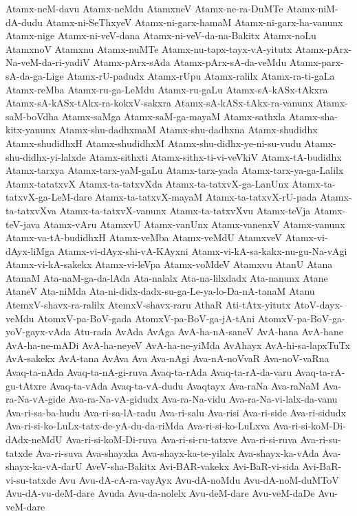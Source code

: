 {Atamx-neM-davu
Atamx-neMdu
AtamxneV
Atamx-ne-ra-DuMTe
Atamx-niM-dA-dudu
Atamx-ni-SeThxyeV
Atamx-ni-garx-hamaM
Atamx-ni-garx-ha-vanunx
Atamx-nige
Atamx-ni-veV-dana
Atamx-ni-veV-da-na-Bakitx
Atamx-noLu
AtamxnoV
Atamxnu
Atamx-nuMTe
Atamx-nu-tapx-tayx-vA-yitutx
Atamx-pArx-Na-veM-da-ri-yadiV
Atamx-pArx-sAda
Atamx-pArx-sA-da-veMdu
Atamx-parx-sA-da-ga-Lige
Atamx-rU-padudx
Atamx-rUpu
Atamx-ralilx
Atamx-ra-ti-gaLa
Atamx-reMba
Atamx-ru-ga-LeMdu
Atamx-ru-gaLu
Atamx-sA-kASx-tAkxra
Atamx-sA-kASx-tAkx-ra-kokxV-sakxra
Atamx-sA-kASx-tAkx-ra-vanunx
Atamx-saM-boVdha
Atamx-saMga
Atamx-saM-ga-mayaM
Atamx-sathxla
Atamx-sha-kitx-yanunx
Atamx-shu-dadhxmaM
Atamx-shu-dadhxna
Atamx-shudidhx
Atamx-shudidhxH
Atamx-shudidhxM
Atamx-shu-didhx-ye-ni-su-vudu
Atamx-shu-didhx-yi-lalxde
Atamx-sithxti
Atamx-sithx-ti-vi-veVkiV
Atamx-tA-budidhx
Atamx-tarxya
Atamx-tarx-yaM-gaLu
Atamx-tarx-yada
Atamx-tarx-ya-ga-Lalilx
Atamx-tatatxvX
Atamx-ta-tatxvXda
Atamx-ta-tatxvX-ga-LanUnx
Atamx-ta-tatxvX-ga-LeM-dare
Atamx-ta-tatxvX-mayaM
Atamx-ta-tatxvX-rU-pada
Atamx-ta-tatxvXva
Atamx-ta-tatxvX-vanunx
Atamx-ta-tatxvXvu
Atamx-teVja
Atamx-teV-java
Atamx-vAru
AtamxvU
Atamx-vanUnx
Atamx-vanenxV
Atamx-vanunx
Atamx-va-tA-budidhxH
Atamx-veMba
Atamx-veMdU
AtamxveV
Atamx-vi-dAyx-liMga
Atamx-vi-dAyx-shi-vA-KAyxni
Atamx-vi-kA-sa-kakx-nu-gu-Na-vAgi
Atamx-vi-kA-sakekx
Atamx-vi-leVpa
Atamx-voMdeV
Atamxvu
AtanU
Atana
AtanaM
Ata-naM-ga-da-lAda
Ata-nalalx
Ata-na-lilxdadx
Ata-nanunx
Atane
AtaneV
Ata-niMda
Ata-ni-didx-dadx-su-ga-Le-ya-lo-Da-nA-tanaM
Atanu
AtemxV-shavx-ra-ralilx
AtemxV-shavx-raru
AthaR
Ati-tAtx-yitutx
AtoV-dayx-veMdu
AtomxV-pa-BoV-gada
AtomxV-pa-BoV-ga-jA-tAni
AtomxV-pa-BoV-ga-yoV-gayx-vAda
Atu-rada
AvAda
AvAga
AvA-ha-nA-saneV
AvA-hana
AvA-hane
AvA-ha-ne-mADi
AvA-ha-neyeV
AvA-ha-ne-yiMda
AvAhayx
AvA-hi-sa-lapxTuTx
AvA-sakekx
AvA-tana
AvAva
Ava
Ava-nAgi
Ava-nA-noVvaR
Ava-noV-vaRna
Avaq-ta-nAda
Avaq-ta-nA-gi-ruva
Avaq-ta-rAda
Avaq-ta-rA-da-varu
Avaq-ta-rA-gu-tAtxre
Avaq-ta-vAda
Avaq-ta-vA-dudu
Avaqtayx
Ava-raNa
Ava-raNaM
Ava-ra-Na-vA-gide
Ava-ra-Na-vA-gidudx
Ava-ra-Na-vidu
Ava-ra-Na-vi-lalx-da-vanu
Ava-ri-sa-ba-hudu
Ava-ri-sa-lA-radu
Ava-ri-salu
Ava-risi
Ava-ri-side
Ava-ri-sidudx
Ava-ri-si-ko-LuLx-tatx-de-yA-du-da-riMda
Ava-ri-si-ko-LuLxva
Ava-ri-si-koM-Di-dAdx-neMdU
Ava-ri-si-koM-Di-ruva
Ava-ri-si-ru-tatxve
Ava-ri-si-ruva
Ava-ri-su-tatxde
Ava-ri-suva
Ava-shayxka
Ava-shayx-ka-te-yilalx
Ava-shayx-ka-vAda
Ava-shayx-ka-vA-darU
AveV-sha-Bakitx
Avi-BAR-vakekx
Avi-BaR-vi-sida
Avi-BaR-vi-su-tatxde
Avu
Avu-dA-cA-ra-vayAyx
Avu-dA-noMdu
Avu-dA-noM-duMToV
Avu-dA-vu-deM-dare
Avuda
Avu-da-nolelx
Avu-deM-dare
Avu-veM-daDe
Avu-veM-dare
}
